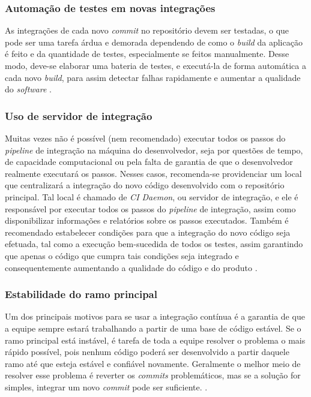 \subsubsection{Automação de testes em novas integrações}
As integrações de cada novo \emph{commit} no repositório devem ser testadas, o que pode ser uma tarefa árdua e demorada dependendo de como o \emph{build} da aplicação é feito e da quantidade de testes, especialmente se feitos manualmente. Desse modo, deve-se elaborar uma bateria de testes, e executá-la de forma automática a cada novo \emph{build}, para assim detectar falhas rapidamente e aumentar a qualidade do \emph{software} \cite{gitlab-ci-cd,martin-fowler-continuous-integration}.


\subsubsection{Uso de servidor de integração}\label{subsecao-servidor-de-integracao}
Muitas vezes não é possível (nem recomendado) executar todos os passos do \emph{pipeline} de integração na máquina do desenvolvedor, seja por questões de tempo, de capacidade computacional ou pela falta de garantia de que o desenvolvedor realmente executará os passos. Nesses casos, recomenda-se providenciar um local que centralizará a integração do novo código desenvolvido com o repositório principal. Tal local é chamado de \emph{CI Daemon}, ou servidor de integração, e ele é responsável por executar todos os passos do \emph{pipeline} de integração, assim como disponibilizar informações e relatórios sobre os passos executados. Também é recomendado estabelecer condições para que a integração do novo código seja efetuada, tal como a execução bem-sucedida de todos os testes, assim garantindo que apenas o código que cumpra tais condições seja integrado e consequentemente aumentando a qualidade do código e do produto \cite{martin-fowler-continuous-integration,continuous-delivery-jez-humble}.

\subsubsection{Estabilidade do ramo principal}
Um dos principais motivos para se usar a integração contínua é a garantia de que a equipe sempre estará trabalhando a partir de uma base de código estável. Se o ramo principal está instável, é tarefa de toda a equipe resolver o problema o mais rápido possível, pois nenhum código poderá ser desenvolvido a partir daquele ramo até que esteja estável e confiável novamente. Geralmente o melhor meio de resolver esse problema é reverter os \emph{commits} problemáticos, mas se a solução for simples, integrar um novo \emph{commit} pode ser suficiente. \cite{martin-fowler-continuous-integration}.

